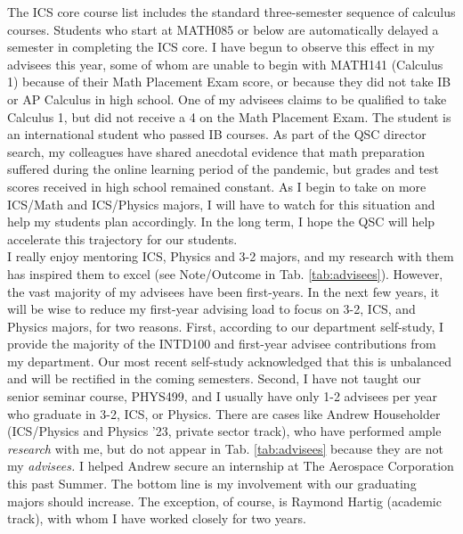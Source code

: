 \documentclass[../../main.tex]{subfiles}
\begin{document}
The ICS core course list includes the standard three-semester sequence of calculus courses.  Students who start at MATH085 or below are automatically delayed a semester in completing the ICS core.  I have begun to observe this effect in my advisees this year, some of whom are unable to begin with MATH141 (Calculus 1) because of their Math Placement Exam score, or because they did not take IB or AP Calculus in high school.  One of my advisees claims to be qualified to take Calculus 1, but did not receive a 4 on the Math Placement Exam.  The student is an international student who passed IB courses.  As part of the QSC director search, my colleagues have shared anecdotal evidence that math preparation suffered during the online learning period of the pandemic, but grades and test scores received in high school remained constant.  As I begin to take on more ICS/Math and ICS/Physics majors, I will have to watch for this situation and help my students plan accordingly.  In the long term, I hope the QSC will help accelerate this trajectory for our students.
\\
\vspace{0.25cm}
I really enjoy mentoring ICS, Physics and 3-2 majors, and my research with them has inspired them to excel (see Note/Outcome in Tab. \ref{tab:advisees}).  However, the vast majority of my advisees have been first-years.  In the next few years, it will be wise to reduce my first-year advising load to focus on 3-2, ICS, and Physics majors, for two reasons.  First, according to our department self-study, I provide the majority of the INTD100 and first-year advisee contributions from my department.  Our most recent self-study acknowledged that this is unbalanced and will be rectified in the coming semesters.  Second, I have not taught our senior seminar course, PHYS499, and I usually have only 1-2 advisees per year who graduate in 3-2, ICS, or Physics.  There are cases like Andrew Householder (ICS/Physics and Physics '23, private sector track), who have performed ample \textit{research} with me, but do not appear in Tab. \ref{tab:advisees} because they are not my \textit{advisees.}  I helped Andrew secure an internship at The Aerospace Corporation this past Summer.  The bottom line is my involvement with our graduating majors should increase.  The exception, of course, is Raymond Hartig (academic track), with whom I have worked closely for two years.
\\
\vspace{0.25cm}
\end{document}
